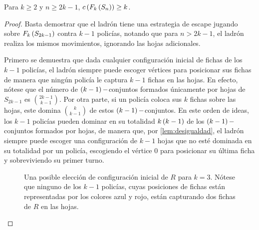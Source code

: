 \begin{teorema}
\label{teo:cota_estrella}
    Para $k\geq 2$ y $n\geq 2k-1$, $c\left( F_{k}\left( S_n\right)\right) \geq k$.
\end{teorema}


\begin{proof}
    Basta demostrar que el ladr\'on tiene una estrategia de escape jugando sobre
    $F_{k}\left( S_{2k-1}\right)$ contra $k-1$ polic\'ias, notando que para $n > 2k-1$, el
    ladr\'on realiza los mismos movimientos, ignorando las hojas adicionales.

    Primero se demuestra que dada cualquier configuraci\'on inicial de fichas de
    los $k-1$ polic\'ias, el ladr\'on siempre puede escoger v\'ertices para
    posicionar sus fichas de manera que ning\'un polic\'ia le captura $k-1$
    fichas en las hojas. En efecto, n\'otese que el n\'umero de
    $\left( k-1\right)-$conjuntos formados \'unicamente por hojas de $S_{2k-1}$ es
    $\binom{2k-1}{k-1}$. Por otra parte, si un polic\'ia coloca sus $k$ fichas
    sobre las hojas, este domina $\binom{k}{k-1}$ de estos $\left( k-1\right)-$conjuntos.
    En este orden de ideas, los $k-1$ polic\'ias pueden dominar en su totalidad
    $k\left( k-1\right)$ de los $\left( k-1\right)-$conjuntos formados por hojas, de manera que, por
    \cref{lem:desigualdad}, el ladr\'on siempre puede escoger una
    configuraci\'on de $k-1$ hojas que no est\'e dominada en su totalidad por un
    polic\'ia, escogiendo el v\'ertice $0$ para posicionar su \'ultima ficha y
    sobreviviendo su primer turno. 

    \begin{figure}[h]
        \centering
        \caption{Una posible elecci\'on de configuraci\'on inicial de $R$ para $k=3$. N\'otese que ninguno de los $k-1$ polic\'ias, cuyas posiciones de fichas est\'an representadas por los colores azul y rojo, est\'an capturando dos fichas de $R$ en las hojas.}
        \label{fig:Configuracion_inicial}
    \end{figure}


\end{proof}
